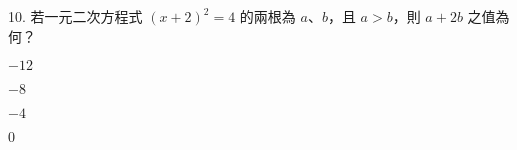 \documentclass[12pt]{article}
\begin{document}
\begin{problem}[widest=10]
  \item[10.] 若一元二次方程式 $(x+2)^2 = 4$ 的兩根為 $a$、$b$，且 $a > b$，則 $a + 2b$ 之值為何？
  \begin{choices}
    \item $-12$
    \item $-8$
    \item $-4$
    \item $0$
  \end{choices}
\end{problem}
\end{document}
